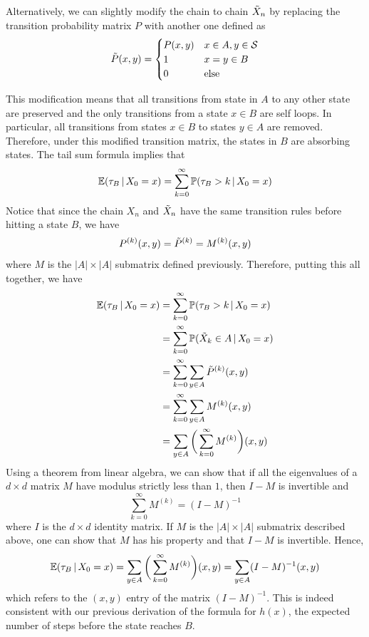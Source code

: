 \begin{example}
		Alternatively, we can slightly modify the chain to chain $\Tilde{X}_n$ by replacing the transition probability matrix $P$ with another one defined as 
		\begin{equation}
			\Tilde{P}(x, y) = \begin{cases}
			P(x, y) & x \in A, y \in \mathcal{S} \\
			1 & x = y \in B \\
			0 & \text{else}
			\end{cases}
		\end{equation}

		This modification means that all transitions from state in $A$ to any other state are preserved and the only transitions from a state $x \in B$ are self loops. In particular, all transitions from states $x \in B$ to states $y \in A$ are removed. Therefore, under this modified transition matrix, the states in $B$ are absorbing states. The tail sum formula implies that
		\begin{equation}
			\operatorname{\mathbb{E}}(\tau_B \,|\, X_0 = x) = \sum_{k=0}^\infty \mathbb{P}(\tau_B > k \,|\, X_0 = x)
		\end{equation}
		Notice that since the chain $X_n$ and $\Tilde{X}_n$ have the same transition rules before hitting a state $B$, we have 
		\begin{equation}
			P^{(k)} (x, y) = \Tilde{P}^{(k)} = M^{(k)}(x, y)
		\end{equation}
		where $M$ is the $|A| \times |A|$ submatrix defined previously. Therefore, putting this all together, we have
		\begin{align*}
			\operatorname{\mathbb{E}}(\tau_B \,|\, X_0 = x) & = \sum_{k=0}^\infty \mathbb{P}(\tau_B > k \,|\, X_0 = x) \\
			& = \sum_{k=0}^\infty \mathbb{P}(\Tilde{X}_k \in A \,|\, X_0 = x) \\
			& = \sum_{k=0}^\infty \sum_{y \in A} \Tilde{P}^{(k)} (x, y) \\
			& = \sum_{k=0}^\infty \sum_{y \in A} M^{(k)} (x, y) \\
			& = \sum_{y \in A} \bigg( \sum_{k=0}^\infty M^{(k)} \bigg) (x, y) 
		\end{align*}
		Using a theorem from linear algebra, we can show that if all the eigenvalues of a $d \times d$ matrix $M$ have modulus strictly less than $1$, then $I-M$ is invertible and
		\begin{equation}
			\sum_{k=0}^\infty M^{(k)} = (I - M)^{-1}
		\end{equation}
		where $I$ is the $d \times d$ identity matrix. If $M$ is the $|A| \times |A|$ submatrix described above, one can show that $M$ has his property and that $I - M$ is invertible. Hence, 
		\begin{equation}
			\operatorname{\mathbb{E}}(\tau_B \,|\, X_0 = x) = \sum_{y \in A} \bigg( \sum_{k=0}^\infty M^{(k)} \bigg) (x, y) = \sum_{y \in A} (I-M)^{-1} (x, y)
		\end{equation}
		which refers to the $(x, y)$ entry of the matrix $(I - M)^{-1}$. This is indeed consistent with our previous derivation of the formula for $h(x)$, the expected number of steps before the state reaches $B$.
	\end{example}

